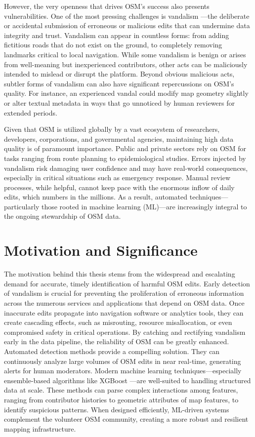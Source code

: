 \documentclass[
    13pt, %
    a4paper, %
    twoside, 
    DIV14, %
    listof=totoc, %
    bibliography=totoc, %
    index=totoc, %
    headsepline
]{scrreprt}
\begin{document}
However, the very openness that drives OSM’s success also presents vulnerabilities. One of the most pressing challenges is vandalism \cite{vandalism_osm}—the deliberate or accidental submission of erroneous or malicious edits that can undermine data integrity and trust. Vandalism can appear in countless forms: from adding fictitious roads that do not exist on the ground, to completely removing landmarks critical to local navigation. While some vandalism is benign or arises from well-meaning but inexperienced contributors, other acts can be maliciously intended to mislead or disrupt the platform. Beyond obvious malicious acts, subtler forms of vandalism can also have significant repercussions on OSM’s quality. For instance, an experienced vandal could modify map geometry slightly or alter textual metadata in ways that go unnoticed by human reviewers for extended periods.

Given that OSM is utilized globally by a vast ecosystem of researchers, developers, corporations, and governmental agencies, maintaining high data quality is of paramount importance. Public and private sectors rely on OSM for tasks ranging from route planning to epidemiological studies. Errors injected by vandalism risk damaging user confidence and may have real-world consequences, especially in critical situations such as emergency response. Manual review processes, while helpful, cannot keep pace with the enormous inflow of daily edits, which numbers in the millions. As a result, automated techniques—particularly those rooted in machine learning (ML)—are increasingly integral to the ongoing stewardship of OSM data.

\section{Motivation and Significance}
\label{sec:motivation_significance}

The motivation behind this thesis stems from the widespread and escalating demand for accurate, timely identification of harmful OSM edits. Early detection of vandalism is crucial for preventing the proliferation of erroneous information across the numerous services and applications that depend on OSM data. Once inaccurate edits propagate into navigation software or analytics tools, they can create cascading effects, such as misrouting, resource misallocation, or even compromised safety in critical operations. By catching and rectifying vandalism early in the data pipeline, the reliability of OSM can be greatly enhanced. Automated detection methods provide a compelling solution. They can continuously analyze large volumes of OSM edits in near real-time, generating alerts for human moderators. Modern machine learning techniques—especially ensemble-based algorithms like XGBoost \cite{xgboost_documentation, xgboost_paper}—are well-suited to handling structured data at scale. These methods can parse complex interactions among features, ranging from contributor histories to geometric attributes of map features, to identify suspicious patterns. When designed efficiently, ML-driven systems complement the volunteer OSM community, creating a more robust and resilient mapping infrastructure.
\end{document}

